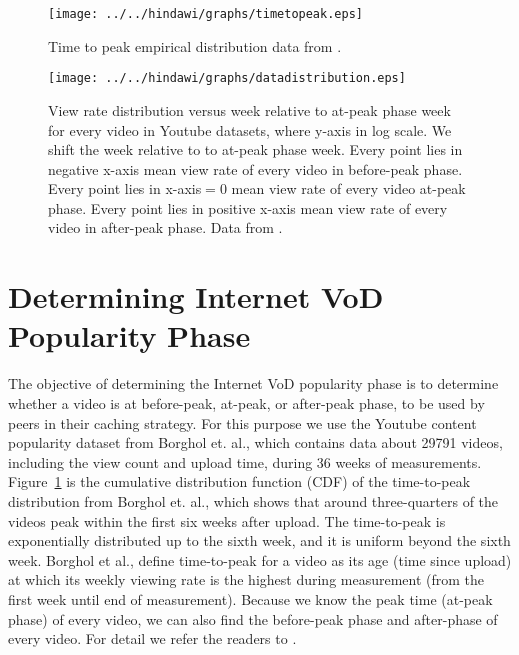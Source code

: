 
\begin{figure}[!t]
\begin{center}
\texttt{[image: ../../hindawi/graphs/timetopeak.eps]}
\end{center}
\caption{Time to peak empirical distribution data from \cite{Borghol:2011:CMP:2039452.2039717}.}
\label{fig:timetopeak}
\end{figure} 

\begin{figure}[!t]
\begin{center}
\texttt{[image: ../../hindawi/graphs/datadistribution.eps]}
\end{center}
\caption{View rate distribution versus week relative to at-peak phase week for every video in Youtube datasets, where y-axis in log scale.
We shift the week relative to to at-peak phase week.
Every point lies in negative x-axis mean view rate of every video in before-peak phase.
Every point lies in x-axis$=0$ mean view rate of every video at-peak phase. 
Every point lies in positive x-axis mean view rate of every video in after-peak phase.
Data from \cite{Borghol:2011:CMP:2039452.2039717}.
}
\label{fig:viewratedistribution}
\end{figure} 


\section{Determining Internet VoD Popularity Phase}\label{popularity}

The objective of determining the Internet VoD popularity phase is to determine whether a video is at before-peak, at-peak, or after-peak phase, to be used by peers in their caching strategy.
For this purpose we use the Youtube content popularity dataset from Borghol et. al.,\cite{Borghol:2011:CMP:2039452.2039717}  which contains data about 29791 videos, including the view count and upload time, during 36 weeks of measurements.
Figure~\ref{fig:timetopeak} is the cumulative distribution function (CDF) of the time-to-peak distribution from Borghol et. al.,\cite{Borghol:2011:CMP:2039452.2039717}  which shows that around three-quarters of the videos peak within the first six weeks after upload.
The time-to-peak is exponentially distributed up to the sixth week, and it is uniform beyond the sixth week.
Borghol et al., \cite{Borghol:2011:CMP:2039452.2039717} define time-to-peak for a video as its age (time since upload) at which its weekly viewing rate is the highest during measurement (from the first week until end of measurement).
Because we know the peak time (at-peak phase) of every video, we can also find the before-peak phase and after-phase of every video. 
For detail we refer the readers to \cite{Borghol:2011:CMP:2039452.2039717}.

